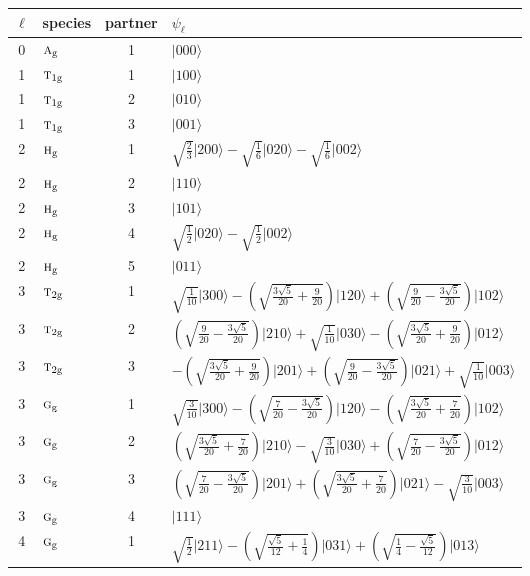 \documentclass[11pt]{article}
\newcommand{\irr}[1]{\text{\normalfont\scshape #1}}
\newcommand{\ptag}[1]{\mathrm{#1}}
\newcommand{\occ}[1]{\lvert #1\rangle}
\begin{document}
\begin{longtable}{c l c p{}}\hline $\ell$ & species & partner & $\psi_\ell$\\ \hline\endhead
0 & $\irr{a}_{\ptag{g}}$ & 1 & $\occ{000}$\\
\hline
1 & $\irr{t}_{1\ptag{g}}$ & 1 & $\occ{100}$\\
1 & $\irr{t}_{1\ptag{g}}$ & 2 & $\occ{010}$\\
1 & $\irr{t}_{1\ptag{g}}$ & 3 & $\occ{001}$\\
\hline
2 & $\irr{h}_{\ptag{g}}$ & 1 & $\sqrt{\tfrac{2}{3}}\occ{200}-\sqrt{\tfrac{1}{6}}\occ{020}-\sqrt{\tfrac{1}{6}}\occ{002}$\\
2 & $\irr{h}_{\ptag{g}}$ & 2 & $\occ{110}$\\
2 & $\irr{h}_{\ptag{g}}$ & 3 & $\occ{101}$\\
2 & $\irr{h}_{\ptag{g}}$ & 4 & $\sqrt{\tfrac{1}{2}}\occ{020}-\sqrt{\tfrac{1}{2}}\occ{002}$\\
2 & $\irr{h}_{\ptag{g}}$ & 5 & $\occ{011}$\\
\hline
3 & $\irr{t}_{2\ptag{g}}$ & 1 & $\sqrt{\tfrac{1}{10}}\occ{300}-(\sqrt{\frac{3 \sqrt{5}}{20} + \frac{9}{20}})\occ{120}+(\sqrt{\frac{9}{20} - \frac{3 \sqrt{5}}{20}})\occ{102}$\\
3 & $\irr{t}_{2\ptag{g}}$ & 2 & $(\sqrt{\frac{9}{20} - \frac{3 \sqrt{5}}{20}})\occ{210}+\sqrt{\tfrac{1}{10}}\occ{030}-(\sqrt{\frac{3 \sqrt{5}}{20} + \frac{9}{20}})\occ{012}$\\
3 & $\irr{t}_{2\ptag{g}}$ & 3 & $-(\sqrt{\frac{3 \sqrt{5}}{20} + \frac{9}{20}})\occ{201}+(\sqrt{\frac{9}{20} - \frac{3 \sqrt{5}}{20}})\occ{021}+\sqrt{\tfrac{1}{10}}\occ{003}$\\
3 & $\irr{g}_{\ptag{g}}$ & 1 & $\sqrt{\tfrac{3}{10}}\occ{300}-(\sqrt{\frac{7}{20} - \frac{3 \sqrt{5}}{20}})\occ{120}-(\sqrt{\frac{3 \sqrt{5}}{20} + \frac{7}{20}})\occ{102}$\\
3 & $\irr{g}_{\ptag{g}}$ & 2 & $(\sqrt{\frac{3 \sqrt{5}}{20} + \frac{7}{20}})\occ{210}-\sqrt{\tfrac{3}{10}}\occ{030}+(\sqrt{\frac{7}{20} - \frac{3 \sqrt{5}}{20}})\occ{012}$\\
3 & $\irr{g}_{\ptag{g}}$ & 3 & $(\sqrt{\frac{7}{20} - \frac{3 \sqrt{5}}{20}})\occ{201}+(\sqrt{\frac{3 \sqrt{5}}{20} + \frac{7}{20}})\occ{021}-\sqrt{\tfrac{3}{10}}\occ{003}$\\
3 & $\irr{g}_{\ptag{g}}$ & 4 & $\occ{111}$\\
\hline
4 & $\irr{g}_{\ptag{g}}$ & 1 & $\sqrt{\tfrac{1}{2}}\occ{211}-(\sqrt{\frac{\sqrt{5}}{12} + \frac{1}{4}})\occ{031}+(\sqrt{\frac{1}{4} - \frac{\sqrt{5}}{12}})\occ{013}$\\

\end{longtable}
\end{document}
